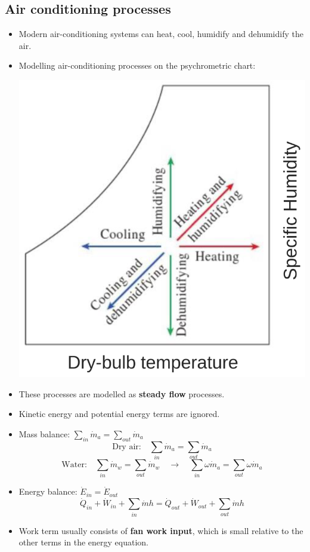 \documentclass[11pt]{article}
\begin{document}
\subsection{Air conditioning processes}
\label{sec:orgdd782b6}
\begin{itemize}
\item Modern air-conditioning systems can heat, cool, humidify and dehumidify the air.
\item Modelling air-conditioning processes on the psychrometric chart:
\begin{center}
\includegraphics[scale=0.65]{./images/air-conditioning-processes-on-a-psychrometric-chart.png}
\end{center}
\item These processes are modelled as \textbf{steady flow} processes.
\item Kinetic energy and potential energy terms are ignored.
\item Mass balance: \(\sum_{in} \dot{m}_a = \sum_{out} \dot{m}_a\)
\[\text{Dry air:} \quad \sum_{in} \dot{m}_a = \sum_{out} \dot{m}_a\]
\[\text{Water:} \quad \sum_{in} \dot{m}_w = \sum_{out} \dot{m}_w \quad \rightarrow \quad \sum_{in} \omega \dot{m}_a = \sum_{out} \omega \dot{m}_a\]
\item Energy balance: \(\dot{E}_{in} = \dot{E}_{out}\)
\[\dot{Q}_{in} + \dot{W}_{in} + \sum_{in} \dot{m} h = \dot{Q}_{out} + \dot{W}_{out} + \sum_{out} \dot{m} h\]
\item Work term usually consists of \textbf{fan work input}, which is small relative to the other terms in the energy equation.
\end{itemize}
\end{document}
